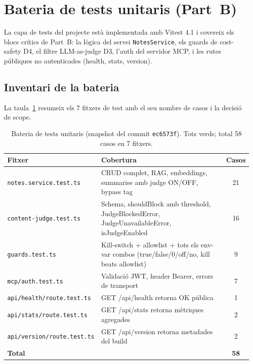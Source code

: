 \section{Bateria de tests unitaris (Part~B)}
\label{sec:tests-unitaris}

La capa de tests del projecte està implementada amb Vitest 4.1 i covereix els blocs crítics de Part~B: la lògica del servei \texttt{NotesService}, els guards de cost-safety D4, el filtre LLM-as-judge D3, l'auth del servidor MCP, i les rutes públiques no autenticades (health, stats, version).

\subsection{Inventari de la bateria}

La taula~\ref{tab:tests-overview} resumeix els 7 fitxers de test amb el seu nombre de casos i la decisió de scope.

\begin{table}[H]
    \centerfloat
    \footnotesize
    \caption{Bateria de tests unitaris (snapshot del commit \texttt{ec6573f}). Tots verds; total 58 casos en 7 fitxers.}
    \label{tab:tests-overview}
    \begin{tabular}{@{}l>{\raggedright\arraybackslash}p{6cm}c@{}}
        \toprule
        Fitxer & Cobertura & Casos \\
        \midrule
        \texttt{notes.service.test.ts} & CRUD complet, RAG, embeddings, summarise amb judge ON/OFF, bypass tag & 21 \\
        \texttt{content-judge.test.ts} & Schema, shouldBlock amb threshold, JudgeBlockedError, JudgeUnavailableError, isJudgeEnabled & 16 \\
        \texttt{guards.test.ts} & Kill-switch + allowlist + tots els env-var combos (true/false/0/off/no, kill beats allowlist) & 9 \\
        \texttt{mcp/auth.test.ts} & Validació JWT, header Bearer, errors de transport & 7 \\
        \texttt{api/health/route.test.ts} & GET /api/health retorna OK pública & 1 \\
        \texttt{api/stats/route.test.ts} & GET /api/stats retorna mètriques agregades & 2 \\
        \texttt{api/version/route.test.ts} & GET /api/version retorna metadades del build & 2 \\
        \midrule
        \textbf{Total} & & \textbf{58} \\
        \bottomrule
    \end{tabular}
\end{table}

